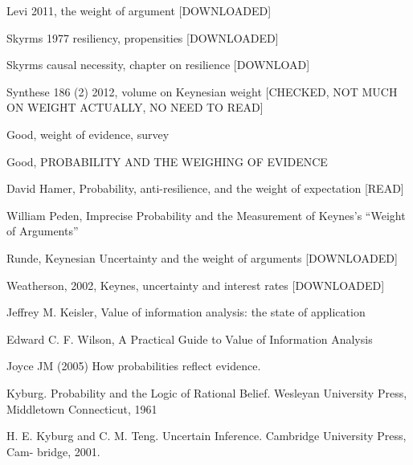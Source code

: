 \documentclass[
  10pt,
  dvipsnames,enabledeprecatedfontcommands]{scrartcl}
\begin{document}
Levi 2011, the weight of argument {[}DOWNLOADED{]}

Skyrms 1977 resiliency, propensities {[}DOWNLOADED{]}

Skyrms causal necessity, chapter on resilience {[}DOWNLOAD{]}

Synthese 186 (2) 2012, volume on Keynesian weight {[}CHECKED, NOT MUCH
ON WEIGHT ACTUALLY, NO NEED TO READ{]}

Good, weight of evidence, survey

Good, PROBABILITY AND THE WEIGHING OF EVIDENCE

David Hamer, Probability, anti-resilience, and the weight of expectation
{[}READ{]}

William Peden, Imprecise Probability and the Measurement of Keynes's
``Weight of Arguments''

Runde, Keynesian Uncertainty and the weight of arguments
{[}DOWNLOADED{]}

Weatherson, 2002, Keynes, uncertainty and interest rates
{[}DOWNLOADED{]}

Jeffrey M. Keisler, Value of information analysis: the state of
application

Edward C. F. Wilson, A Practical Guide to Value of Information Analysis

Joyce JM (2005) How probabilities reflect evidence.

Kyburg. Probability and the Logic of Rational Belief. Wesleyan
University Press, Middletown Connecticut, 1961

H. E. Kyburg and C. M. Teng. Uncertain Inference. Cambridge University
Press, Cam- bridge, 2001.
\end{document}
